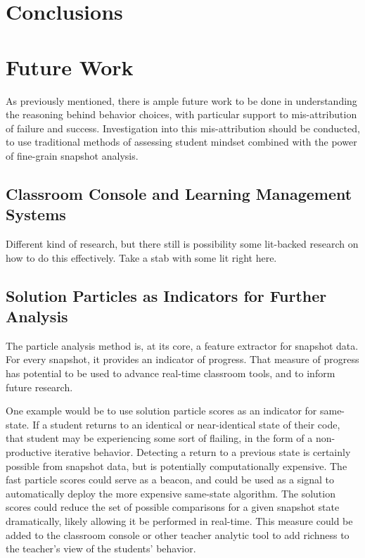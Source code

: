 \section{Conclusions}


\section{Future Work}
\label{sec:futurework}

As previously mentioned, there is ample future work to be done in understanding the reasoning behind behavior choices, with particular support to mis-attribution of failure and success. Investigation into this mis-attribution should be conducted, to use traditional methods of assessing student mindset combined with the power of fine-grain snapshot analysis. 

\subsection{Classroom Console and Learning Management Systems}
Different kind of research, but there still is possibility some lit-backed research on how to do this effectively. Take a stab with some lit right here.

\subsection{Solution Particles as Indicators for Further Analysis}
The particle analysis method is, at its core, a feature extractor for snapshot data. For every snapshot, it provides an indicator of progress. That measure of progress has potential to be used to advance real-time classroom tools, and to inform future research. 

One example would be to use solution particle scores as an indicator for same-state. If a student returns to an identical or near-identical state of their code, that student may be experiencing some sort of flailing, in the form of a non-productive iterative behavior. Detecting a return to a previous state is certainly possible from snapshot data, but is potentially computationally expensive. The fast particle scores could serve as a beacon, and could be used as a signal to automatically deploy the more expensive same-state algorithm. The solution scores could reduce the set of possible comparisons for a given snapshot state dramatically, likely allowing it be performed in real-time. This measure could be added to the classroom console or other teacher analytic tool to add richness to the teacher's view of the students' behavior. 

